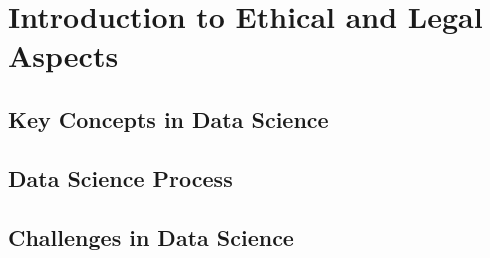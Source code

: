 \section{Introduction to Ethical and
Legal Aspects}


\subsection{Key Concepts in Data Science}

\subsection{Data Science Process}

\subsection{Challenges in Data Science}